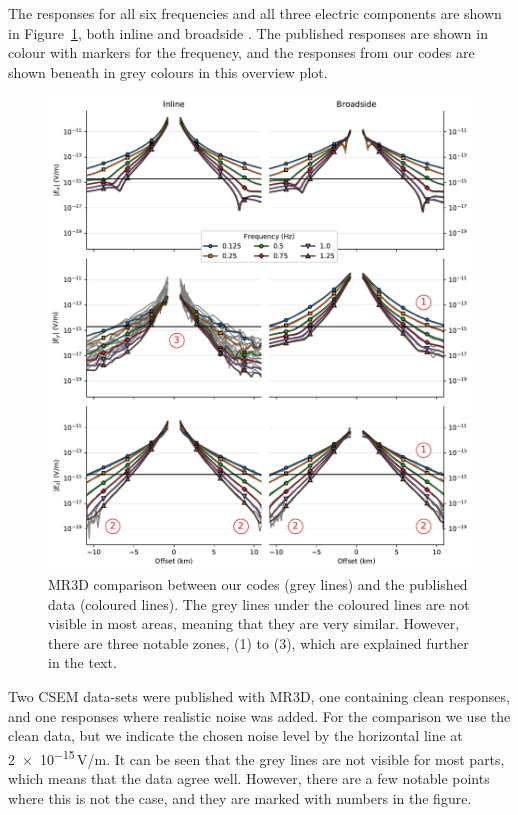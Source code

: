 \documentclass[extra, camera,%
]{gji}
\begin{document}
The responses for all six frequencies and all three electric components are shown in Figure~\ref{fig:results-marlim-responses}, both inline and broadside . The published responses are shown in colour with markers for the frequency, and the responses from our codes are shown beneath in grey colours in this overview plot.
%
\begin{figure}
  \centering
  \includegraphics[width=.9\linewidth]{figures/results-marlim-responses}
  \caption{MR3D comparison between our codes (grey lines) and the published data (coloured lines). The grey lines under the coloured lines are not visible in most areas, meaning that they are very similar. However, there are three notable zones, (1) to (3), which are explained further in the text.}
  \label{fig:results-marlim-responses}
\end{figure}
%
Two CSEM data-sets were published with MR3D, one containing clean responses, and one responses where realistic noise was added. For the comparison we use the clean data, but we indicate the chosen noise level by the horizontal line at \num{2e-15}\,V/m. It can be seen that the grey lines are not visible for most parts, which means that the data agree well. However, there are a few notable points where this is not the case, and they are marked with numbers in the figure.
\end{document}
